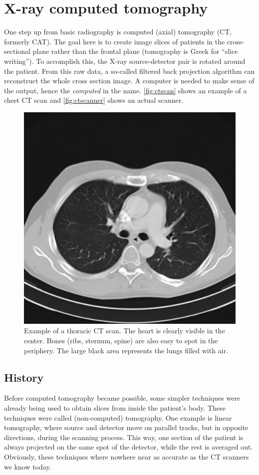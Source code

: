\section{X-ray computed tomography}
One step up from basic radiography is computed (axial) tomography (CT, formerly
CAT). The goal here is to create image slices of patients in the cross-sectional
plane rather than the frontal plane (tomography is Greek for ``slice writing'').
To accomplish this, the X-ray source-detector pair is rotated around the
patient. From this raw data, a so-called filtered back projection algorithm can
reconstruct the whole cross section image. A computer is needed to make sense of
the output, hence the \emph{computed} in the name. \autoref{fig:ctscan} shows an
example of a chest CT scan and \autoref{fig:ctscanner} shows an actual scanner.

\begin{figure}[ht]
\begin{center}
  \includegraphics[width=0.4\linewidth]{img/ct-thorax.jpg}
  \caption{Example of a thoracic CT scan. The heart is clearly visible in the
  center. Bones (ribs, sternum, spine) are also easy to spot in the periphery.
  The large black area represents the lungs filled with air.}
  \label{fig:ctscan}
\end{center}
\end{figure}

\subsection{History}
Before computed tomography became possible, some simpler techniques were already
being used to obtain slices from inside the patient's body. These techniques
were called (non-computed) tomography. One example is linear tomography,
where source and detector move on parallel tracks, but in opposite directions,
during the scanning process. This way, one section of the patient is always
projected on the same spot of the detector, while the rest is averaged out.
Obviously, these techniques where nowhere near as accurate as the CT scanners we
know today.

